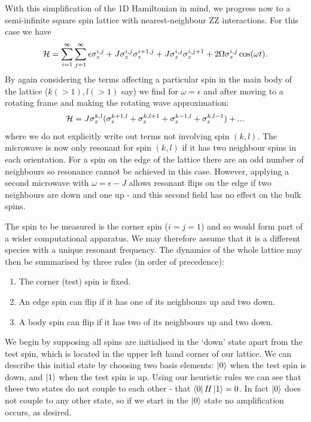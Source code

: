 With this simplification of the 1D Hamiltonian in mind, we progress now to a semi-infinite square spin lattice with nearest-neighbour ZZ interactions. For this case we have
\begin{equation} {\cal H} = \sum_{i=1}^{\infty}\sum_{j=1}^\infty
\epsilon \sigma^{i, j}_z + J \sigma_z^{i, j}\sigma_z^{i+1, j} +
J\sigma_z^{i, j}\sigma_z^{i, j+1} + 2 \Omega \sigma_x^{i, j}
\cos(\omega t).
\end{equation}
By again considering the terms affecting a particular spin in the main body of the lattice ($k(>1), l(>1)$ say) we find for $\omega = \epsilon$ and after moving to a rotating frame and making the rotating wave approximation:
\begin{equation}
{\cal H} = J \sigma_z^{k, l} (\sigma_z^{k+1, l} + \sigma_z^{k, l+1} + \sigma_z^{k-1, l} + \sigma_z^{k, l-1}) +...
\end{equation}
where we do not explicitly write out terms not involving spin $(k, l)$.  The microwave is now only resonant for spin $(k, l)$ if it has two neighbour spins in each orientation. For a spin on the edge of the lattice there are an odd number of neighbours so resonance cannot be achieved in this case. However, applying a second microwave with $\omega = \epsilon - J$ allows resonant flips on the edge if two neighbours are down and one up - and this second field has no effect on the bulk spins.

The spin to be measured is the corner spin ($i=j=1$) and so would form part of a wider computational apparatus. We may therefore assume that it is a different species with a unique resonant frequency. The dynamics of the whole lattice may then be summarised by three rules (in order of precedence):
  \begin{enumerate}
  \item The corner (test) spin is fixed.\vspace{-0.2cm}
  \item An edge spin can flip if it has one of its neighbours up and
  two down.\vspace{-0.2cm}
  \item A body spin can flip if it has two of its neighbours up and two down.\vspace{-0.2cm}
  \end{enumerate}
  We begin by supposing all spins are initialised in the `down' state apart from the test spin, which is located in the upper left hand corner of our lattice. We can describe this initial state by choosing two basis elements: $\left\vert0\right\rangle$ when the test spin is down, and $\left\vert1\right\rangle$ when the test spin is up. Using our heuristic rules we can see that these two states do not couple to each other - that $\left\langle 0\right\vert H\left\vert1\right\rangle=0$. In fact $\left\vert0\right\rangle$ does not couple to any other state, so if we start in the $\left\vert0\right\rangle$ state no amplification occurs, as desired.


